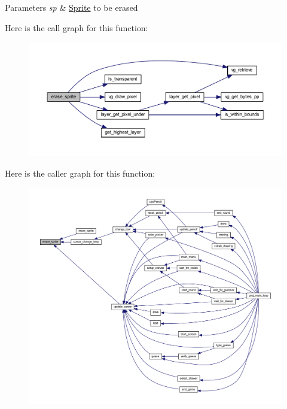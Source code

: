 \begin{DoxyParams}{Parameters}
{\em sp} & \mbox{\hyperlink{struct_sprite}{Sprite}} to be erased \\
\hline
\end{DoxyParams}
Here is the call graph for this function\+:\nopagebreak
\begin{figure}[H]
\begin{center}
\leavevmode
\includegraphics[width=350pt]{group__sprite_ga9c7e23b48dc8ea0f565655744cbae06c_cgraph}
\end{center}
\end{figure}
Here is the caller graph for this function\+:\nopagebreak
\begin{figure}[H]
\begin{center}
\leavevmode
\includegraphics[width=350pt]{group__sprite_ga9c7e23b48dc8ea0f565655744cbae06c_icgraph}
\end{center}
\end{figure}
\mbox{\label{group__sprite_ga1a1688248ec81812ca2c738584e323a4}} 
